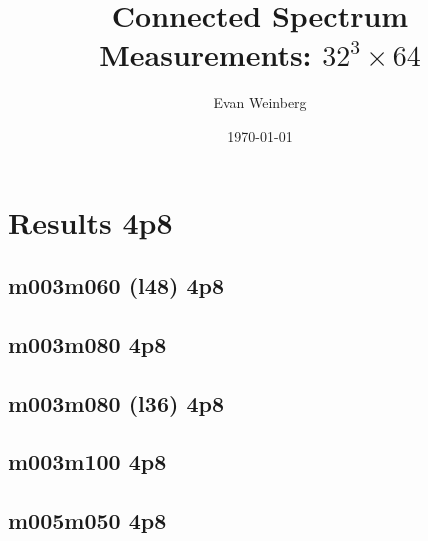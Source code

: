 \documentclass[pdftex,letterpaper,10pt]{article}
\begin{document}
\title{Connected Spectrum Measurements: $32^3 \times 64$}
\author{Evan Weinberg}
\date{\today}
\maketitle

\tableofcontents

\clearpage




\clearpage

\section{Results 4p8}

\subsection{m003m060 (l48) 4p8}



\clearpage \subsection{m003m080 4p8}



\clearpage \subsection{m003m080 (l36) 4p8}



\clearpage \subsection{m003m100 4p8}



\clearpage \subsection{m005m050 4p8}
\end{document}
